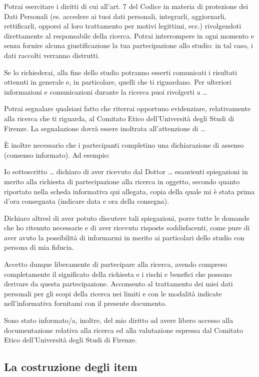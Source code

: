 \documentclass[
  11pt,
]{krantz}
\theoremstyle{definition}
\theoremstyle{definition}
\theoremstyle{definition}
\theoremstyle{definition}
\theoremstyle{remark}
\begin{document}
Potrai esercitare i diritti di cui all'art. 7 del Codice in materia di protezione dei Dati Personali (es. accedere ai tuoi dati personali, integrarli, aggiornarli, rettificarli, opporsi al loro trattamento per motivi legittimi, ecc.) rivolgendoti direttamente al responsabile della ricerca. Potrai interrompere in ogni momento e senza fornire alcuna giustificazione la tua partecipazione allo studio: in tal caso, i dati raccolti verranno distrutti.

Se lo richiederai, alla fine dello studio potranno esserti comunicati i risultati ottenuti in generale e, in particolare, quelli che ti riguardano. Per ulteriori informazioni e comunicazioni durante la ricerca puoi rivolgerti a \ldots{}

Potrai segnalare qualsiasi fatto che riterrai opportuno evidenziare, relativamente alla ricerca che ti riguarda, al Comitato Etico dell'Università degli Studi di Firenze. La segnalazione dovrà essere inoltrata all'attenzione di \ldots{}

È inoltre necessario che i partecipanti completino una dichiarazione di assenso (consenso informato). Ad esempio:

Io sottoscritto \ldots{} dichiaro di aver ricevuto dal Dottor \ldots{} esaurienti spiegazioni in merito alla richiesta di partecipazione alla ricerca in oggetto, secondo quanto riportato nella scheda informativa qui allegata, copia della quale mi è stata prima d'ora consegnata (indicare data e ora della consegna).

Dichiaro altresì di aver potuto discutere tali spiegazioni, porre tutte le domande che ho ritenuto necessarie e di aver ricevuto risposte soddisfacenti, come pure di aver avuto la possibilità di informarmi in merito ai particolari dello studio con persona di mia fiducia.

Accetto dunque liberamente di partecipare alla ricerca, avendo compreso completamente il significato della richiesta e i rischi e benefici che possono derivare da questa partecipazione. Acconsento al trattamento dei miei dati personali per gli scopi della ricerca nei limiti e con le modalità indicate nell'informativa fornitami con il presente documento.

Sono stato informato/a, inoltre, del mio diritto ad avere libero accesso alla documentazione relativa alla ricerca ed alla valutazione espressa dal Comitato Etico dell'Università degli Studi di Firenze.

\hypertarget{la-costruzione-degli-item}{%
\subsection{La costruzione degli item}\label{la-costruzione-degli-item}}
\end{document}
